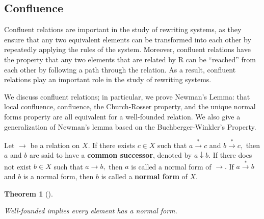 \documentclass[
  letterpaper,
  10pt,
  reqno,
  twopage,
  openany]{book}
\theoremstyle{plain}
\theoremstyle{definition}
\theoremstyle{definition}
\theoremstyle{definition}
\theoremstyle{plain}
\theoremstyle{plain}
\newtheorem{theorem}{Theorem}[chapter]
\theoremstyle{remark}
\begin{document}
\hypertarget{confluence}{%
\subsection{Confluence}\label{confluence}}

Confluent relations are important in the study of rewriting systems, as
they ensure that any two equivalent elements can be transformed into
each other by repeatedly applying the rules of the system. Moreover,
confluent relations have the property that any two elements that are
related by R can be ``reached'' from each other by following a path
through the relation. As a result, confluent relations play an important
role in the study of rewriting systems.

We discuss confluent relations; in particular, we prove Newman's Lemma:
that local confluence, confluence, the Church-Rosser property, and the
unique normal forms property are all equivalent for a well-founded
relation. We also give a generalization of Newman's lemma based on the
Buchberger-Winkler's Property.

Let \(\longrightarrow\) be a relation on \(X.\) If there exists
\(c\in X\) such that \(a\stackrel{*}{\longrightarrow} c\) and
\(b\stackrel{*}{\longrightarrow} c,\) then \(a\) and \(b\) are said to
have a  \textbf{common successor}, denoted by
\(a \downarrow b.\) If there does not exist \(b\in X\) such that
\(a\longrightarrow b,\) then \(a\) is called a normal form of
\(\longrightarrow.\) If \(a\stackrel{*}{\longrightarrow} b\) and \(b\)
is a normal form, then \(b\) is called a 
\textbf{normal form} of \(X.\)

\leavevmode{}%
\begin{theorem}[]\label{thm-well-founded-normal-form}

Well-founded implies every element has a normal form.

\end{theorem}
\end{document}
